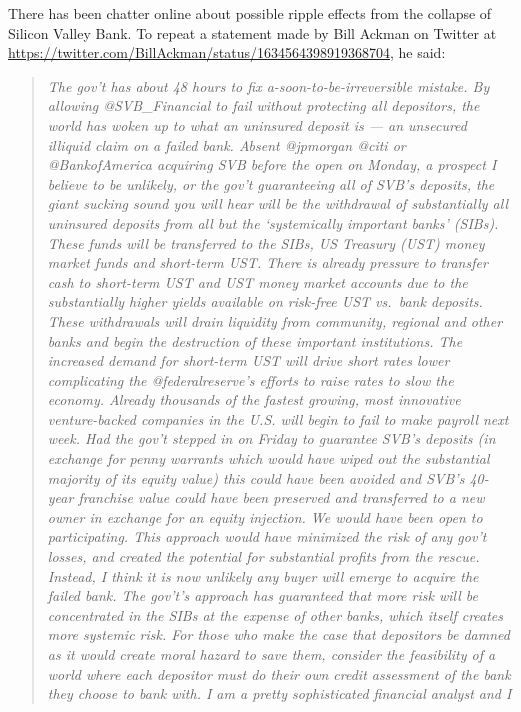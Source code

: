 There has been chatter online about possible ripple effects from the
collapse of Silicon Valley Bank. To repeat a statement made by Bill
Ackman on Twitter at
\url{https://twitter.com/BillAckman/status/1634564398919368704}, he
said:

\begin{quote}
\emph{The gov't has about 48 hours to fix a-soon-to-be-irreversible
mistake. By allowing @SVB\_Financial to fail without protecting all
depositors, the world has woken up to what an uninsured deposit is ---
an unsecured illiquid claim on a failed bank. Absent @jpmorgan @citi or
@BankofAmerica acquiring SVB before the open on Monday, a prospect I
believe to be unlikely, or the gov't guaranteeing all of SVB's deposits,
the giant sucking sound you will hear will be the withdrawal of
substantially all uninsured deposits from all but the `systemically
important banks' (SIBs). These funds will be transferred to the SIBs, US
Treasury (UST) money market funds and short-term UST. There is already
pressure to transfer cash to short-term UST and UST money market
accounts due to the substantially higher yields available on risk-free
UST vs.~bank deposits. These withdrawals will drain liquidity from
community, regional and other banks and begin the destruction of these
important institutions. The increased demand for short-term UST will
drive short rates lower complicating the @federalreserve's efforts to
raise rates to slow the economy. Already thousands of the fastest
growing, most innovative venture-backed companies in the U.S. will begin
to fail to make payroll next week. Had the gov't stepped in on Friday to
guarantee SVB's deposits (in exchange for penny warrants which would
have wiped out the substantial majority of its equity value) this could
have been avoided and SVB's 40-year franchise value could have been
preserved and transferred to a new owner in exchange for an equity
injection. We would have been open to participating. This approach would
have minimized the risk of any gov't losses, and created the potential
for substantial profits from the rescue. Instead, I think it is now
unlikely any buyer will emerge to acquire the failed bank. The gov't's
approach has guaranteed that more risk will be concentrated in the SIBs
at the expense of other banks, which itself creates more systemic risk.
For those who make the case that depositors be damned as it would create
moral hazard to save them, consider the feasibility of a world where
each depositor must do their own credit assessment of the bank they
choose to bank with. I am a pretty sophisticated financial analyst and I
}
\end{quote}
